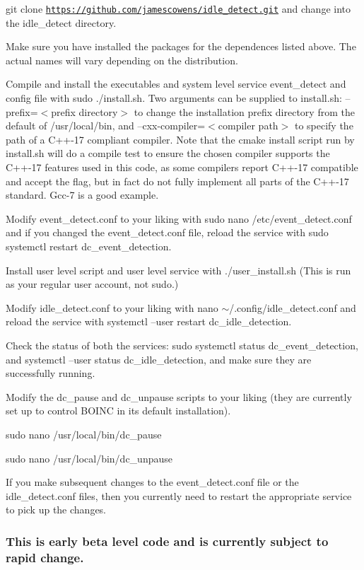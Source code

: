 \begin{DoxyEnumerate}
\item git clone \href{https://github.com/jamescowens/idle_detect.git}{\tt https\+://github.\+com/jamescowens/idle\+\_\+detect.\+git} and change into the idle\+\_\+detect directory.
\item Make sure you have installed the packages for the dependences listed above. The actual names will vary depending on the distribution.
\item Compile and install the executables and system level service event\+\_\+detect and config file with sudo ./install.sh. Two arguments can be supplied to install.\+sh\+: --prefix=$<$prefix directory$>$ to change the installation prefix directory from the default of /usr/local/bin, and --cxx-\/compiler=$<$compiler path$>$ to specify the path of a C++-\/17 compliant compiler. Note that the cmake install script run by install.\+sh will do a compile test to ensure the chosen compiler supports the C++-\/17 features used in this code, as some compilers report C++-\/17 compatible and accept the flag, but in fact do not fully implement all parts of the C++-\/17 standard. Gcc-\/7 is a good example.
\item Modify event\+\_\+detect.\+conf to your liking with sudo nano /etc/event\+\_\+detect.conf and if you changed the event\+\_\+detect.\+conf file, reload the service with sudo systemctl restart dc\+\_\+event\+\_\+detection.
\item Install user level script and user level service with ./user\+\_\+install.sh (This is run as your regular user account, not sudo.)
\item Modify idle\+\_\+detect.\+conf to your liking with nano $\sim$/.config/idle\+\_\+detect.\+conf and reload the service with systemctl --user restart dc\+\_\+idle\+\_\+detection.
\item Check the status of both the services\+: sudo systemctl status dc\+\_\+event\+\_\+detection, and systemctl --user status dc\+\_\+idle\+\_\+detection, and make sure they are successfully running.
\item Modify the dc\+\_\+pause and dc\+\_\+unpause scripts to your liking (they are currently set up to control B\+O\+I\+NC in its default installation).
\end{DoxyEnumerate}
\begin{DoxyItemize}
\item sudo nano /usr/local/bin/dc\+\_\+pause
\item sudo nano /usr/local/bin/dc\+\_\+unpause
\end{DoxyItemize}
\begin{DoxyEnumerate}
\item If you make subsequent changes to the event\+\_\+detect.\+conf file or the idle\+\_\+detect.\+conf files, then you currently need to restart the appropriate service to pick up the changes.
\end{DoxyEnumerate}

\subsubsection*{This is early beta level code and is currently subject to rapid change.}